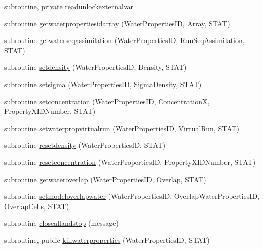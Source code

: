 \begin{DoxyCompactItemize}
\item 
subroutine, private \mbox{\hyperlink{namespacemodulewaterproperties_ac4ba6844cdc46e6fc258842be3a9e82b}{readunlockexternalvar}}
\item 
subroutine \mbox{\hyperlink{namespacemodulewaterproperties_a3d2d1a142ceb72d246c0254f29e4595c}{getwaterpropertiesidarray}} (Water\+Properties\+ID, Array, S\+T\+AT)
\item 
subroutine \mbox{\hyperlink{namespacemodulewaterproperties_afd2b779c6911ab6d6436d6d813a338c7}{getwaterseqassimilation}} (Water\+Properties\+ID, Run\+Seq\+Assimilation, S\+T\+AT)
\item 
subroutine \mbox{\hyperlink{namespacemodulewaterproperties_a0e9ad0864f289819d005ffe929ac3f86}{setdensity}} (Water\+Properties\+ID, Density, S\+T\+AT)
\item 
subroutine \mbox{\hyperlink{namespacemodulewaterproperties_a84c625b22d0fa0200b0f18fc38efb8e7}{setsigma}} (Water\+Properties\+ID, Sigma\+Density, S\+T\+AT)
\item 
subroutine \mbox{\hyperlink{namespacemodulewaterproperties_aea5dfa662931ed10a0e9543a5150c9b5}{setconcentration}} (Water\+Properties\+ID, ConcentrationX, Property\+X\+I\+D\+Number, S\+T\+AT)
\item 
subroutine \mbox{\hyperlink{namespacemodulewaterproperties_abc01d8d69bf69056b5ad8b7fc0ebb668}{setwaterpropvirtualrun}} (Water\+Properties\+ID, Virtual\+Run, S\+T\+AT)
\item 
subroutine \mbox{\hyperlink{namespacemodulewaterproperties_ac8f850628190d4096c329efc4d1880cc}{resetdensity}} (Water\+Properties\+ID, S\+T\+AT)
\item 
subroutine \mbox{\hyperlink{namespacemodulewaterproperties_a09f49ce7e65baca37ff989dd6573e711}{resetconcentration}} (Water\+Properties\+ID, Property\+X\+I\+D\+Number, S\+T\+AT)
\item 
subroutine \mbox{\hyperlink{namespacemodulewaterproperties_a923a45b4d978be815b69f1ca9bb63891}{getwateroverlap}} (Water\+Properties\+ID, Overlap, S\+T\+AT)
\item 
subroutine \mbox{\hyperlink{namespacemodulewaterproperties_a485e6f75e05fccffb1b2eba1fc8c0226}{setmodeloverlapwater}} (Water\+Properties\+ID, Overlap\+Water\+Properties\+ID, Overlap\+Cells, S\+T\+AT)
\item 
subroutine \mbox{\hyperlink{namespacemodulewaterproperties_a5bb74dfe4637836633ca6817a4a72758}{closeallandstop}} (message)
\item 
subroutine, public \mbox{\hyperlink{namespacemodulewaterproperties_a1b9de12d1335129516b68f6f80f85e49}{killwaterproperties}} (Water\+Properties\+ID, S\+T\+AT)

\end{DoxyCompactItemize}
